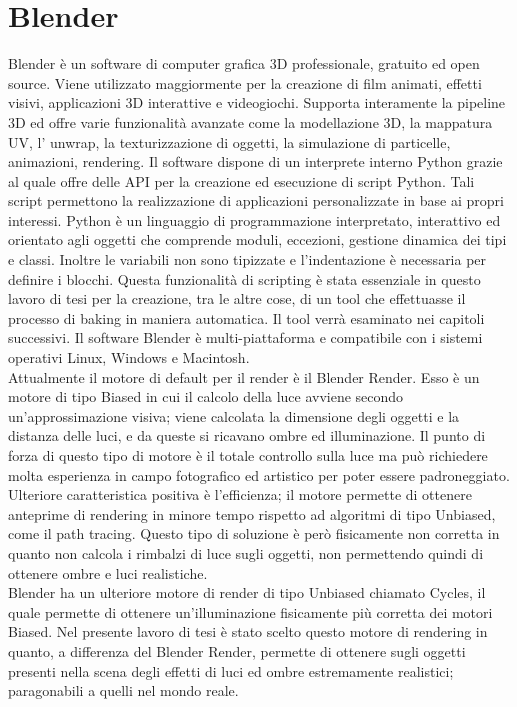\section{Blender}
\label{sec:chapter_tecnologie_abilitanti_blender}

Blender è un software di computer grafica 3D professionale, gratuito ed open source. 
Viene utilizzato maggiormente per la creazione di film animati, effetti visivi, applicazioni 3D interattive e videogiochi.
Supporta interamente la pipeline 3D ed offre varie funzionalità avanzate come la modellazione 3D, la mappatura UV, l’ unwrap, la texturizzazione di oggetti, la simulazione di particelle, animazioni, rendering.
Il software dispone di un interprete interno Python grazie al quale offre delle API per la creazione ed esecuzione di script Python. 
Tali script permettono la realizzazione di applicazioni personalizzate in base ai propri interessi.
Python è un linguaggio di programmazione interpretato, interattivo ed orientato agli oggetti che comprende moduli, eccezioni, gestione dinamica dei tipi e classi. Inoltre le variabili non sono tipizzate e l’indentazione è necessaria per definire i blocchi.
Questa funzionalità di scripting è stata essenziale in questo lavoro di tesi per la creazione, tra le altre cose, di un tool che effettuasse il processo di baking in maniera automatica. Il tool verrà esaminato nei capitoli successivi.
Il software Blender è multi-piattaforma e compatibile con i sistemi operativi Linux, Windows e Macintosh.
\\
Attualmente il motore di default per il render è il Blender Render. Esso è un motore di tipo Biased in cui il calcolo della luce avviene secondo un’approssimazione visiva; viene calcolata la dimensione degli oggetti e la distanza delle luci, e da queste si ricavano ombre ed illuminazione.
Il punto di forza di questo tipo di motore è il totale controllo sulla luce ma può richiedere molta esperienza in campo fotografico ed artistico per poter essere padroneggiato. Ulteriore caratteristica positiva è l’efficienza; il motore permette di ottenere anteprime di rendering in minore tempo rispetto ad algoritmi di tipo Unbiased, come il path tracing.
Questo tipo di soluzione è però fisicamente non corretta in quanto non calcola i rimbalzi di luce sugli oggetti, non permettendo quindi di ottenere ombre e luci realistiche.
\\
Blender ha un ulteriore motore di render di tipo Unbiased chiamato Cycles, il quale permette di ottenere un’illuminazione fisicamente più corretta dei motori Biased.
Nel presente lavoro di tesi è stato scelto questo motore di rendering in quanto, a differenza del Blender Render, permette di ottenere sugli oggetti presenti nella scena degli effetti di luci ed ombre estremamente realistici; paragonabili a quelli nel mondo reale.
